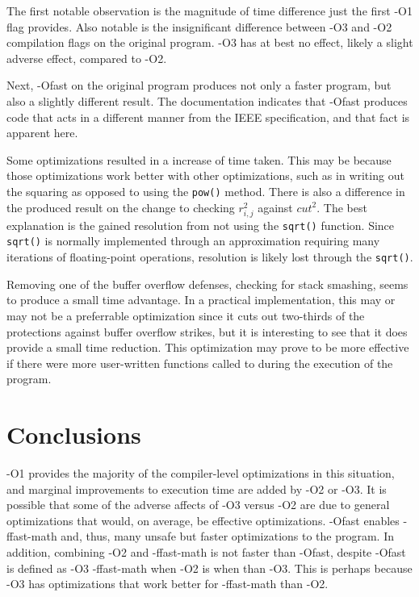 \documentclass[12pt]{article}
\begin{document}
	The first notable observation is the magnitude of time difference just the first -O1 flag provides. 
	Also notable is the insignificant difference between -O3 and -O2 compilation flags on the original program.
	-O3 has at best no effect, likely a slight adverse effect, compared to -O2. 

	Next, -Ofast on the original program produces not only a faster program, but also a slightly different result.
	The documentation indicates that -Ofast produces code that acts in a different manner from the IEEE specification, and that fact is apparent here.

	Some optimizations resulted in a increase of time taken.
	This may be because those optimizations work better with other optimizations, 
	such as in writing out the squaring as opposed to using the \texttt{pow()} method.
	There is also a difference in the produced result on the change to checking $r_{i,j}^2$ against $cut^2$.
	The best explanation is the gained resolution from not using the \texttt{sqrt()} function.
	Since \texttt{sqrt()} is normally implemented through an approximation requiring many iterations of floating-point operations,
	resolution is likely lost through the \texttt{sqrt()}.

	Removing one of the buffer overflow defenses, checking for stack smashing, seems to produce a small time advantage.
	In a practical implementation, this may or may not be a preferrable optimization 
	since it cuts out two-thirds of the protections against buffer overflow strikes, but it is interesting to see that it does provide a small time reduction.
	This optimization may prove to be more effective if there were more user-written functions called to during the execution of the program.

	\section{Conclusions}

	-O1 provides the majority of the compiler-level optimizations in this situation, and marginal improvements to execution time are added by -O2 or -O3.
	It is possible that some of the adverse affects of -O3 versus -O2 are due to general optimizations that would, on average, be effective optimizations.
	-Ofast enables -ffast-math and, thus, many unsafe but faster optimizations to the program.
	In addition, combining -O2 and -ffast-math is not faster than -Ofast, despite -Ofast is defined as -O3 -ffast-math when -O2 is when than -O3.
	This is perhaps because -O3 has optimizations that work better for -ffast-math than -O2.
\end{document}
